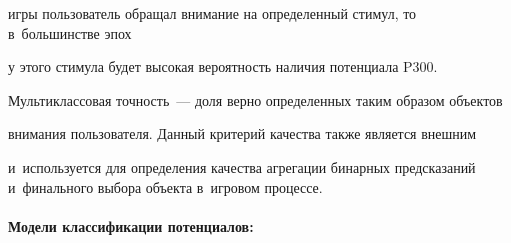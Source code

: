 игры пользователь обращал внимание на определенный стимул, то в~большинстве эпох 

у этого стимула будет высокая вероятность наличия потенциала P300. 

Мультиклассовая точность~--- доля верно определенных таким образом объектов 

внимания пользователя. Данный критерий качества также является внешним 

и~используется для определения качества агрегации бинарных предсказаний и~финального выбора объекта в~игровом процессе.



\paragraph*{Модели классификации потенциалов:}



\noindent

